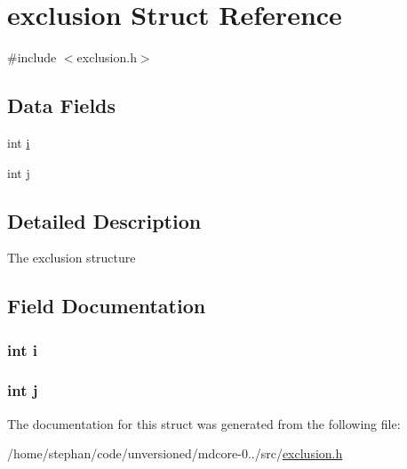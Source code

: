 \hypertarget{structexclusion}{\section{exclusion Struct Reference}
\label{structexclusion}
}


{\ttfamily \#include $<$exclusion.\-h$>$}

\subsection*{Data Fields}
\begin{DoxyCompactItemize}
\item 
int \hyperlink{structexclusion_acb559820d9ca11295b4500f179ef6392}{i}
\item 
int \hyperlink{structexclusion_a37d972ae0b47b9099e30983131d31916}{j}
\end{DoxyCompactItemize}


\subsection{Detailed Description}
The exclusion structure 

\subsection{Field Documentation}
\hypertarget{structexclusion_acb559820d9ca11295b4500f179ef6392}{
\subsubsection[{i}]{\setlength{\rightskip}{0pt plus 5cm}int i}}\label{structexclusion_acb559820d9ca11295b4500f179ef6392}
\hypertarget{structexclusion_a37d972ae0b47b9099e30983131d31916}{
\subsubsection[{j}]{\setlength{\rightskip}{0pt plus 5cm}int j}}\label{structexclusion_a37d972ae0b47b9099e30983131d31916}


The documentation for this struct was generated from the following file\-:\begin{DoxyCompactItemize}
\item 
/home/stephan/code/unversioned/mdcore-\/0../src/\hyperlink{exclusion_8h}{exclusion.\-h}\end{DoxyCompactItemize}
